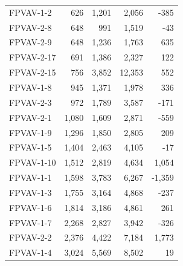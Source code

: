 \begin{table}[]
\begin{tabular}{lrrrr}
FPVAV-1-2         & 626                      &  1,201                  & 2,056                    &  -385                    \\
FPVAV-2-8         & 648                      &  991                    & 1,519                    &  -43                     \\
FPVAV-2-9         & 648                      &  1,236                  & 1,763                    &  635                     \\
FPVAV-2-17        & 691                      &  1,386                  & 2,327                    &  122                     \\
FPVAV-2-15        & 756                      &  3,852                  & 12,353                   &  552                     \\
FPVAV-1-8         & 945                      &  1,371                  & 1,978                    &  336                     \\
FPVAV-2-3         & 972                      &  1,789                  & 3,587                    &  -171                    \\
FPVAV-2-1         & 1,080                    &  1,609                  & 2,871                    &  -559                    \\
FPVAV-1-9         & 1,296                    &  1,850                  & 2,805                    &  209                     \\
FPVAV-1-5         & 1,404                    &  2,463                  & 4,105                    &  -17                     \\
FPVAV-1-10        & 1,512                    &  2,819                  & 4,634                    &  1,054                   \\
FPVAV-1-1         & 1,598                    &  3,783                  & 6,267                    &  -1,359                  \\
FPVAV-1-3         & 1,755                    &  3,164                  & 4,868                    &  -237                    \\
FPVAV-1-6         & 1,814                    &  3,186                  & 4,861                    &  261                     \\
FPVAV-1-7         & 2,268                    &  2,827                  & 3,942                    &  -326                    \\
FPVAV-2-2         & 2,376                    &  4,422                  & 7,184                    &  1,773                   \\
FPVAV-1-4         & 3,024                    &  5,569                  & 8,502                    &  19                      \\
    \bottomrule
\end{tabular}
\end{table}

